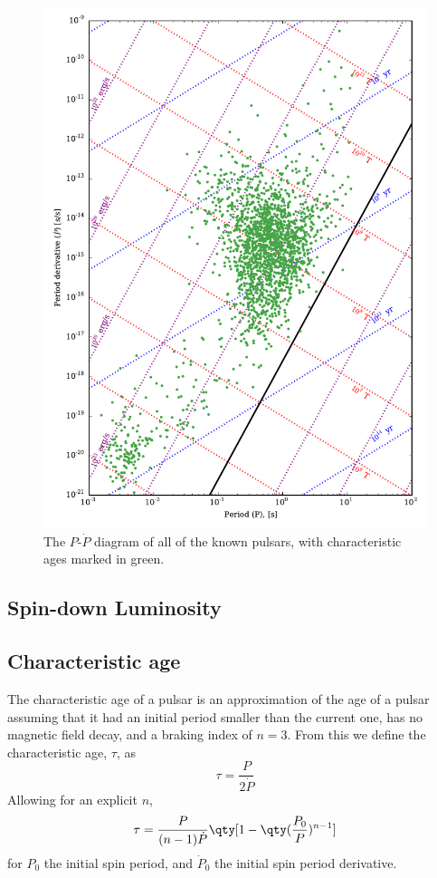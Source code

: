 \begin{figure}
\includegraphics{figures/ppdot.pdf}
\caption{The $P$-$\dot{P}$ diagram of all of the known pulsars, with characteristic ages marked in green.}
\label{fig:ppdot}
\end{figure}

\subsection{Spin-down Luminosity}
\label{sec:spin-down-luminosity}



\subsection{Characteristic age}
\label{sec:characteristic-age}

The characteristic age of a pulsar is an approximation of the age of a
pulsar assuming that it had an initial period smaller than the current
one, has no magnetic field decay, and a braking index of $n=3$. From
this we define the characteristic age, $\tau$, as
\begin{equation}
  \label{eq:95}
  \tau = \frac{P}{2 \dot{P}}
\end{equation}
Allowing for an explicit $n$,
\begin{equation}
  \label{eq:96}
  \tau = \frac{P}{(n-1) \dot{P}} \qty[ 1 - \qty(\frac{P_0}{P})^{n-1} ]
\end{equation}
for $P_0$ the initial spin period, and $\dot{P}_0$ the initial spin
period derivative.

